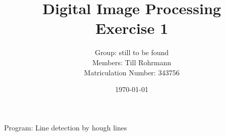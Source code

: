 \documentclass{article}
\title{Digital Image Processing\\Exercise 1}
\author{Group: still to be found \\Members: Till Rohrmann\\Matriculation Number: 343756}
\date{\today}
\begin{document}
\maketitle

Program: Line detection by hough lines
\end{document}
